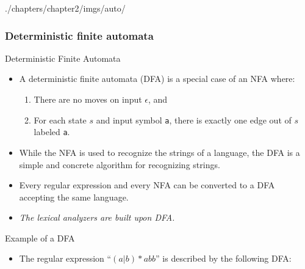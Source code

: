 \begin{graphicspathcontext}{{./chapters/chapter2/imgs/auto/}}
\begin{bibunit}[apalike]
\subsubsection{Deterministic finite automata}

\tableofcontentslide[sections={1-5},sectionstyle={show/shaded},subsectionstyle={show/shaded/hide},subsubsectionstyle={show/shaded/hide/hide}]

\begin{frame}{Deterministic Finite Automata}
	\begin{itemize}
	\item A deterministic finite automata (DFA) is a special case of an NFA where:
		\begin{enumerate}
		\item There are no moves on input $\epsilon$, and
		\item For each state $s$ and input symbol \texttt{a}, there is exactly one edge out of $s$ labeled \texttt{a}.
		\end{enumerate}
	\vfill
	\item While the NFA is used to recognize the strings of a language, the DFA is a simple and concrete algorithm for recognizing strings.
	\vfill
	\item Every regular expression and every NFA can be converted to a DFA accepting the same language.
	\vfill
	\item \emph{The lexical analyzers are built upon DFA.}
	\end{itemize}
\end{frame}


\begin{frame}{Example of a DFA}
	\begin{itemize}
	\item The regular expression ``$(a|b)*abb$'' is described by the following DFA:
	\end{itemize}
	\vfill
	\begin{center}
	\end{center}
\end{frame}


\end{bibunit}
\end{graphicspathcontext}
